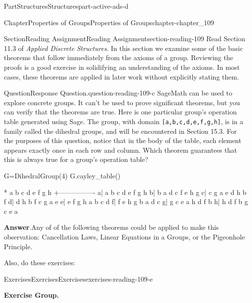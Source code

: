 \documentclass[oneside,10pt,]{book}
\newcommand{\blocktitlefont}{\relax}
\newcommand{\mono}[1]{\texttt{#1}}
\numberwithin{equation}{section}
\begin{document}
\begin{partptx}{Part}{Structures}{}{Structures}{}{}{part-active-ads-d}
\begin{chapterptx}{Chapter}{Properties of Groups}{}{Properties of Groups}{}{}{chapter-chapter_109}
\renewcommand*{\chaptername}{Chapter}
%
%
%
\typeout{************************************************}
\typeout{************************************************}
%
\begin{sectionptx}{Section}{Reading Assignment}{}{Reading Assignment}{}{}{section-reading-109}
Read Section 11.3 of \emph{Applied Discrete Structures}.  In this section we examine some of the basic theorems that follow immediately from the axioms of a group. Reviewing the proofs is a good exercise in solidifying an understanding of the axioms. In most cases, these theorems are applied in later work without explicitly stating them.%
\begin{question}{Question}{Response Question.}{question-reading-109-c}%
SageMath can be used to explore concrete groups.  It can't be used to prove significant theorems, but you can verify that the theorems are true.  Here is one particular group's operation table generated using Sage. The group, with domain \mono{[a,b,c,d,e,f,g,h]}, is in a family called the dihedral groups, and will be encountered in Section 15.3. For the purposes of this question, notice that in the body of the table, each element appears exactly once in each row and column.  Which theorem guarantees that this is always true for a group's operation table?%
\begin{sageinput}
G=DihedralGroup(4)
G.cayley_table()
\end{sageinput}
\begin{sageoutput}
*  a b c d e f g h
 +----------------
a| a b c d e f g h
b| b a d c f e h g
c| c g a e d h b f
d| d h b f c g a e
e| e f g h a b c d
f| f e h g b a d c
g| g c e a h d f b
h| h d f b g c e a
\end{sageoutput}
\par\smallskip%
\noindent\textbf{\blocktitlefont Answer}.\hypertarget{answer-reading-109-c-c}{}\quad{}Any of of the following theorems could be applied to make this observation: Cancellation Laws, Linear Equations in a Groups, or the Pigeonhole Principle.%
\end{question}
Also, do these exercises:%
%
%
\typeout{************************************************}
\typeout{************************************************}
%
\begin{exercises-subsection-numberless}{Exercises}{Exercises}{}{Exercises}{}{}{exercises-reading-109-e}
\par\medskip\noindent%
\textbf{Exercise Group.}\space\space%

\end{exercises-subsection-numberless}
\end{sectionptx}
\end{chapterptx}
\end{partptx}
\end{document}
